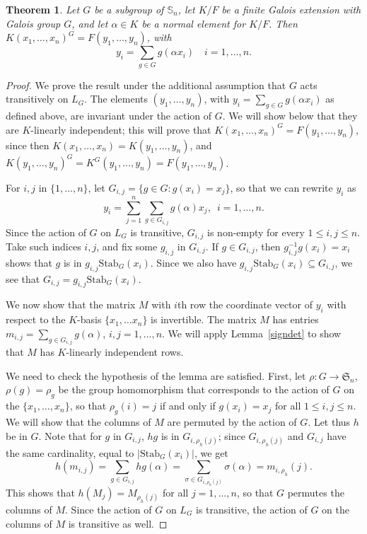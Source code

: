 \documentclass[12pt]{article}
\theoremstyle{plain}
\newtheorem{theorem}{Theorem}
\begin{document}
\begin{theorem}\label{theo:1}
  Let $G$ be a subgroup of $\mathbb{S}_n$, let $K/F$ be a finite
  Galois extension with Galois group $G$, and let $\alpha \in K$ be a
  normal element for $K/F$. Then $ K(x_1,\ldots ,
  x_n)^G=F(y_1,\dots,y_n)$, with
  $$y_i =\sum_{g \in G} g(\alpha x_i) \quad i =
  1,\dots,n.$$
\end{theorem}
\begin{proof}
  We prove the result under the additional assumption that $G$ acts
  transitively on $L_G$.  The elements $(y_1,\dots,y_n)$, with $y_i =
  \sum_{g \in G} g(\alpha x_i)$ as defined above, are invariant under
  the action of $G$. We will show below that they are $K$-linearly
  independent; this will prove that
  $K(x_1,\dots,x_n)^G=F(y_1,\dots,y_n)$, since then
  $K(x_1,\dots,x_n)=K(y_1,\dots,y_n)$, and
  $K(y_1,\dots,y_n)^G=K^G(y_1,\dots,y_n)=F(y_1,\dots,y_n)$.

  For $i,j$ in $\{1,\dots,n\}$, let $G_{i,j}= \lbrace g \in G: g(x_i)
  = x_j \rbrace$, so that we can rewrite $y_i$ as $$y_i = \sum^n_{j
    =1}\sum_{g \in G_{i,j}}g(\alpha)x_j, \,\,\, i = 1, \ldots, n.$$
  Since the action of $G$ on $L_G$ is transitive, $G_{i,j}$ is
  non-empty for every $1 \leq i,j \leq n$.  Take such indices $i,j$,
  and fix some $g_{i,j}$ in $G_{i,j}$. If $g \in G_{i,j}$, then
  $g^{-1}_{i,j}g(x_i) = x_i$ shows that $g$ is in
  $g_{i,j}\mathrm{Stab}_G(x_i)$. Since we also have
  $g_{i,j}\mathrm{Stab}_G(x_i) \subseteq G_{i,j}$, we see that
  $G_{i,j} = g_{i,j}\mathrm{Stab}_G(x_i)$.


  We now show that the matrix $M$ with $i$th row the coordinate vector
  of $y_i$ with respect to the $K$-basis $\lbrace x_1, \ldots x_n
  \rbrace$ is invertible. The matrix $M$ has entries $m_{i,j} =
  \sum_{g \in G_{i,j}}g(\alpha)$, $i,j = 1, \ldots, n$. We will apply
  Lemma~\ref{signdet} to show that $M$ has $K$-linearly independent
  rows.

  We need to check the hypothesis of the lemma are satisfied. First,
  let $\rho: G \longrightarrow \mathfrak{S}_n$, $\rho(g) = \rho_g$ be
  the group homomorphism that corresponds to the action of $G$ on the
  $\lbrace x_1, \ldots , x_n \rbrace$, so that $\rho_g(i) = j$ if and
  only if $g(x_i) = x_j$ for all $1 \leq i,j\leq n$. We will show that
  the columns of $M$ are permuted by the action of $G$. Let thus $h$ be in
  $G$. Note that for $g$ in $G_{i,j}$, $hg$ is in $G_{i,\rho_h(j)}$;
  since  $G_{i,\rho_h(j)}$ and $G_{i,j}$ have the same cardinality,
  equal to $|\mathrm{Stab}_G(x_i)|$, we get
  $$h(m_{i,j}) = \sum_{g \in G_{i,j}}hg(\alpha) = \sum_{\sigma \in
    G_{i, \rho_{h}(j)}}\sigma (\alpha) = m_{i,\rho_{h}}(j).$$ This
  shows that $h(M_j) = M_{\rho_h(j)}$ for all $j = 1, \ldots, n$, so
  that $G$ permutes the columns of $M$. Since the action 
  of $G$ on $L_G$ is transitive, the action of $G$ on the columns 
  of $M$ is transitive as well.
  

\end{proof}
\end{document}
